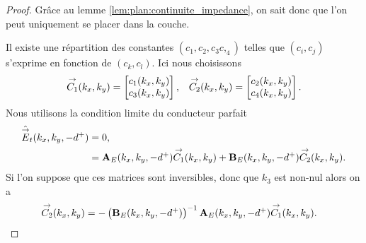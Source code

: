        \begin{proof}
            Grâce au lemme \eqref{lem:plan:continuite_impedance}, on sait donc que l'on peut uniquement se placer dans la couche.

            Il existe une répartition des constantes \((c_1,c_2,c_3c,_4)\) telles que \((c_i,c_j)\) s'exprime en fonction de \((c_k,c_l)\).
            Ici nous choisissons
            \begin{align*}
                {\overset{\rightarrow}{C_1}}(k_x,k_y) = \begin{bmatrix}c_1(k_x,k_y) \\ c_3(k_x,k_y)\end{bmatrix}, 
                && 
                {\overset{\rightarrow}{C_2}}(k_x,k_y) = \begin{bmatrix}c_2(k_x,k_y) \\ c_4(k_x,k_y)\end{bmatrix}.
            \end{align*}
            Nous utilisons la condition limite du conducteur parfait
            \begin{align*}
                \hat{{\overset{\rightarrow}{E}}}_t(k_x,k_y,-d^+) &= 0,
                \\
                &=  \mathbf{A}_E(k_x,k_y,-d^+){\overset{\rightarrow}{C_1}}(k_x,k_y) + \mathbf{B}_E(k_x,k_y,-d^+){\overset{\rightarrow}{C_2}}(k_x,k_y).
            \end{align*}
            Si l’on suppose que ces matrices sont inversibles, donc que \(k_3\) est non-nul alors on a
            \begin{align*}
                {\overset{\rightarrow}{C_2}}(k_x,k_y) &= -\left(\mathbf{B}_E(k_x,k_y,-d^+)\right)^{-1}\mathbf{A}_E(k_x,k_y,-d^+){\overset{\rightarrow}{C_1}}(k_x,k_y).
            \end{align*}

\end{proof}
